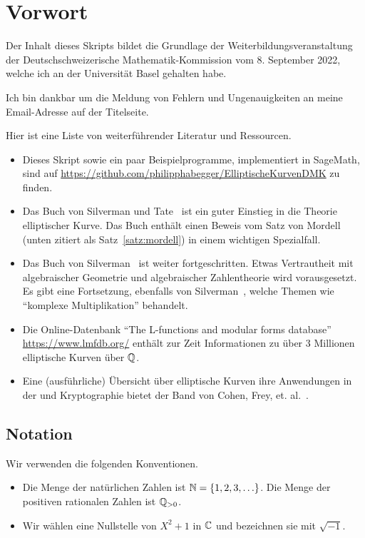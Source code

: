 \chapter{Vorwort}

Der Inhalt dieses Skripts bildet die Grundlage der
Weiterbildungsveranstaltung der Deutschschweizerische
Mathematik-Kommission vom 8. September 2022, welche ich an der
Universität Basel gehalten habe.

Ich bin dankbar um die Meldung von Fehlern und Ungenauigkeiten an
meine Email-Adresse auf der Titelseite.

Hier ist eine Liste von weiterführender Literatur und Ressourcen.
\begin{itemize}
\item Dieses Skript sowie ein paar Beispielprogramme, implementiert in
  SageMath, sind auf
  \url{https://github.com/philipphabegger/ElliptischeKurvenDMK} zu finden.
\item Das Buch von Silverman und Tate~\cite{SilvermanTate}
  ist ein guter Einstieg in die Theorie
  elliptischer Kurve. Das Buch enthält einen Beweis vom Satz von Mordell (unten zitiert
  als Satz~\ref{satz:mordell}) in einem wichtigen Spezialfall.
\item Das Buch von Silverman~\cite{Silverman:AEC} ist weiter
  fortgeschritten. Etwas Vertrautheit mit  algebraischer Geometrie
  und  algebraischer Zahlentheorie wird vorausgesetzt. Es gibt eine
  Fortsetzung, ebenfalls von Silverman~\cite{Silverman:Adv}, welche
  Themen wie ``komplexe Multiplikation'' behandelt.
\item Die Online-Datenbank ``The L-functions and modular forms
  database'' \url{https://www.lmfdb.org/} enthält zur Zeit
  Informationen zu über 3
  Millionen elliptische Kurven über ${\mathbb{Q}}$.
\item Eine (ausführliche) Übersicht über elliptische Kurven ihre
  Anwendungen in der und
  Kryptographie bietet der Band von Cohen, Frey, et. al.~\cite{cohenfrey:handbook}.
\end{itemize}

\section{Notation}

Wir verwenden die folgenden Konventionen.

\begin{itemize}
\item Die Menge der natürlichen Zahlen ist ${\mathbb{N}} = \{1,2,3,\ldots\}$.
  Die Menge der positiven rationalen Zahlen ist ${\mathbb{Q}}_{>0}$. 

\item Wir wählen eine Nullstelle von $X^2+1$ in ${\mathbb{C}}$ und bezeichnen sie
  mit $\sqrt{-1}$.
  
\end{itemize}

